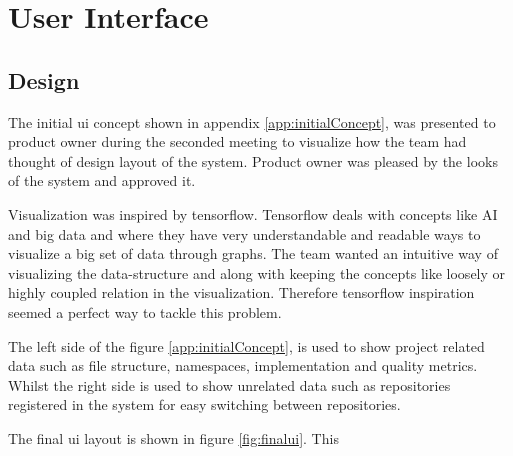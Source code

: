 \chapter{User Interface}
\label{chap:UI}

\section{Design}



The initial \gls{ui} concept shown in appendix \ref{app:initialConcept}, was presented to product owner during the seconded meeting to visualize how the team had thought of design layout of the system. Product owner was pleased by the looks of the system and approved it.

Visualization was inspired by tensorflow. Tensorflow deals with concepts like AI and big data and where they have very understandable and readable ways to visualize a big set of data through graphs. The team wanted an intuitive way of visualizing the data-structure and along with keeping the concepts like loosely or highly coupled relation in the visualization. Therefore tensorflow inspiration seemed a perfect way to tackle this problem.

The left side of the figure \ref{app:initialConcept}, is used to show project related data such as file structure, namespaces, implementation and quality metrics. Whilst the right side is used to show unrelated data such as repositories registered in the system for easy switching between repositories. 

The final \gls{ui} layout is shown in figure \ref{fig:finalui}. This 
























